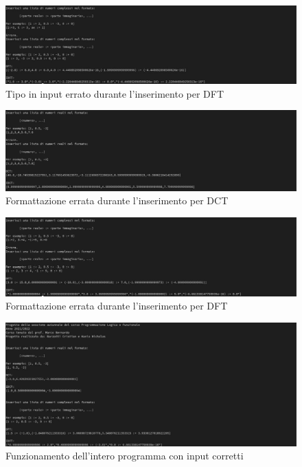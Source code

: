 \documentclass{report}
\begin{document}
    \begin{center}
      \begin{figure}
        \includegraphics[width=\textwidth]{test_hs_6.jpg}
        \caption{Tipo in input errato durante l'inserimento per DFT}
      \end{figure}
    \end{center}

     \begin{center}
       \begin{figure}
         \includegraphics[width=\textwidth]{test_hs_7.jpg}
         \caption{Formattazione errata durante l'inserimento per DCT}
       \end{figure}
     \end{center}

     \begin{center}
       \begin{figure}
         \includegraphics[width=\textwidth]{test_hs_8.jpg}
         \caption{Formattazione errata durante l'inserimento per DFT}
       \end{figure}
     \end{center}

     \begin{center}
       \begin{figure}
         \includegraphics[width=\textwidth]{test_hs_9.jpg}
         \caption{Funzionamento dell'intero programma con input corretti}
       \end{figure}
     \end{center}
\end{document}
